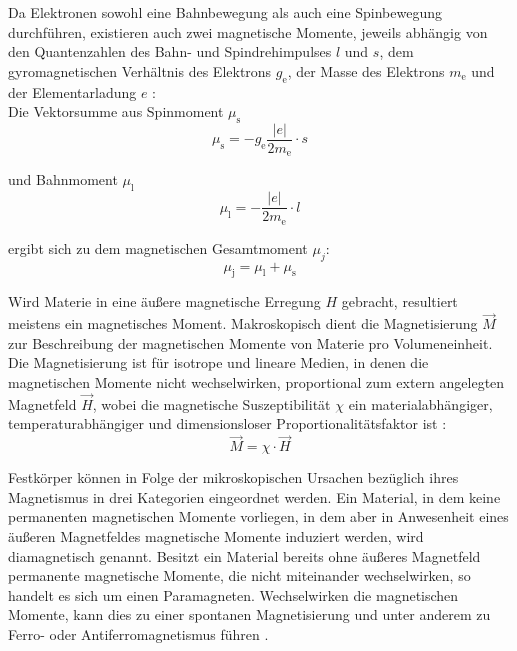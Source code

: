 \documentclass[page,pdftex,12pt,a4paper,twoside,openright]{scrbook}
\begin{document}
Da Elektronen sowohl eine Bahnbewegung als auch eine Spinbewegung durchführen, existieren auch zwei magnetische Momente, jeweils abhängig von den Quantenzahlen des Bahn- und Spindrehimpulses \(l\) und \(s\), dem gyromagnetischen Verhältnis des Elektrons \(g_\mathrm{e}\), der Masse des Elektrons \(m_\mathrm{e}\) und der Elementarladung \(e\) \cite{kassing_bergmann_2005}:\\

Die Vektorsumme aus Spinmoment \(\mu_\mathrm{s}\)\\
\begin{equation}
\label{eq-spinmoment}
 \mu_\mathrm{s} = - g_\mathrm{e} \frac{\vert e \vert}{2 m_\mathrm{e}} \cdot s
\end{equation}


und Bahnmoment \(\mu_\mathrm{l}\) \\
\begin{equation}
\label{eq-bahnmoment}
 \mu_\mathrm{l} = - \frac{\vert e \vert}{2 m_\mathrm{e}} \cdot l
\end{equation}

ergibt sich zu dem magnetischen Gesamtmoment \(\mu_j\):\\
\begin{equation}
\label{eq-gesamtmoment}
\mu_\mathrm{j} = \mu_\mathrm{l} + \mu_\mathrm{s}
\end{equation}

Wird Materie in eine äußere magnetische Erregung \(H\) gebracht, resultiert meistens ein magnetisches Moment. Makroskopisch dient die Magnetisierung \(\vec{M}\) zur Beschreibung der magnetischen Momente von Materie pro Volumeneinheit. Die Magnetisierung ist für isotrope und lineare Medien, in denen die magnetischen Momente nicht wechselwirken, proportional zum extern angelegten Magnetfeld \(\vec{H}\), wobei die magnetische Suszeptibilität \(\chi\) ein materialabhängiger, temperaturabhängiger und dimensionsloser Proportionalitätsfaktor ist \cite{kassing_bergmann_2005,nolting_grundkurs_2013}:\\

\begin{equation}
\label{eq-magnetisierung}
\vec{M} = \chi \cdot \vec{H}
\end{equation}

Festkörper können in Folge der mikroskopischen Ursachen bezüglich ihres Magnetismus in drei Kategorien eingeordnet werden. Ein Material, in dem keine permanenten magnetischen Momente vorliegen, in dem aber in Anwesenheit eines äußeren Magnetfeldes magnetische Momente induziert werden, wird diamagnetisch genannt. Besitzt ein Material bereits ohne äußeres Magnetfeld permanente magnetische Momente, die nicht miteinander wechselwirken, so handelt es sich um einen Paramagneten. Wechselwirken die magnetischen Momente, kann dies zu einer spontanen Magnetisierung und unter anderem zu Ferro- oder Antiferromagnetismus führen \cite{gross_festkorperphysik_2012}.\\
\end{document}
